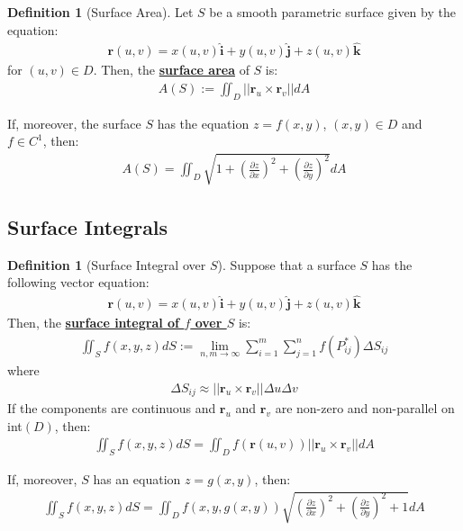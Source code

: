 \documentclass[reqno,11pt]{amsart}
\theoremstyle{definition}
\newtheorem{definition}[theorem]{Definition}
\theoremstyle{remark}
\newcommand{\dfn}[1]{\underline{\textbf{#1}}}
\begin{document}
\begin{definition}[Surface Area]
	Let $S$ be a smooth parametric surface given by the equation:
	\begin{align}
		\mathbf{r}(u,v) = x(u,v) \hat{\mathbf{i}} + y(u,v) \mathbf{\hat{j}} + z(u,v) \mathbf{\hat{k}} 	
	\end{align}
	for $(u,v) \in D$. Then, the \dfn{surface area} of $S$ is:
	\begin{align}
		A(S) := \iint_D || \mathbf{r}_u \times \mathbf{r}_v || dA 	
	\end{align}
\end{definition}
If, moreover, the surface $S$ has the equation $z= f(x,y)$, $(x,y) \in D$ and $f \in C^1$, then:
\begin{align}
	A(S) = \iint_D \sqrt{1 + \left( \frac{\partial z}{\partial x} \right)^2  + \left( \frac{\partial z}{\partial y} \right)^2} dA 	
\end{align}

\subsection{Surface Integrals}
\begin{definition}[Surface Integral over $S$] Suppose that a surface $S$ has the following vector equation:
\begin{align}
	\mathbf{r}(u,v) = x(u,v) \hat{\mathbf{i}} + y(u,v) \hat{\mathbf{j}} + z(u,v) \hat{\mathbf{k}} 	
\end{align}
Then, the \dfn{surface integral of $f$ over $S$} is: 
\begin{align}
	\iint_S f(x,y,z) dS := \lim_{n, m \rightarrow \infty} \sum_{i=1}^m \sum_{j=1}^n f(P^*_{ij}) \Delta S_{ij} 	
\end{align}
where
\begin{align*}
	\Delta S_{ij} \approx || \mathbf{r}_u \times \mathbf{r}_v || \Delta u \Delta v
\end{align*}
If the components are continuous and $\mathbf{r}_u$ and $\mathbf{r}_v$ are non-zero and non-parallel on int$(D)$, then:
\begin{align}
	\iint_S f(x,y,z) dS = \iint_D f( \mathbf{r}(u,v)) || \mathbf{r}_u \times \mathbf{r}_v || dA
\end{align}	
\end{definition}
If, moreover, $S$ has an equation $z=g(x,y)$, then:
\begin{align*}
	\iint_S f(x,y,z) dS = \iint_D f(x,y,g(x,y)) \sqrt{ \left( \frac{\partial z}{\partial x} \right)^2 + \left( \frac{\partial z}{\partial y} \right)^2  + 1 } dA 
\end{align*}
\end{document}
